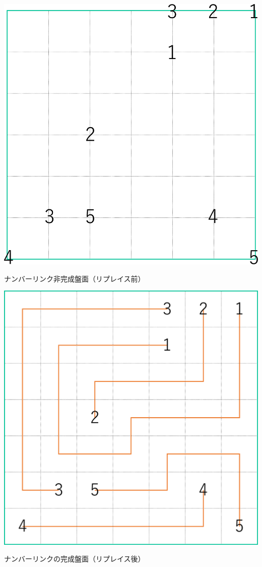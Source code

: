 \begin{clearpagefigure}
  \includegraphics[width=0.85\linewidth,clip]{fig/NumberLinkQuestion.eps}
  \caption{ナンバーリンク非完成盤面（リプレイス前）}
  \label{figure:NumberLinkQuestion}
\end{clearpagefigure}

\begin{clearpagefigure}
  \includegraphics[width=0.85\linewidth,clip]{fig/NumberLinkReplace.eps}
  \caption{ナンバーリンクの完成盤面（リプレイス後）}
  \label{figure:NumberLinkReplace}
\end{clearpagefigure}

